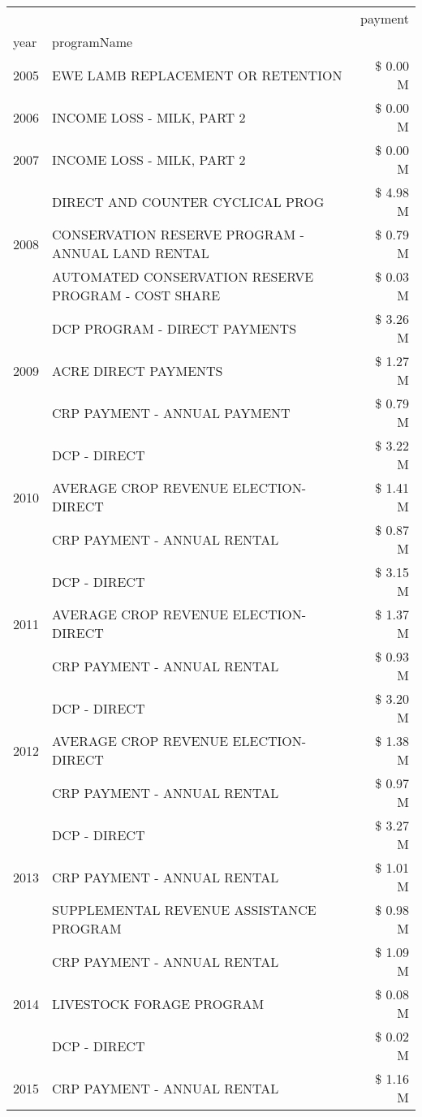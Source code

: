 \begin{tabular}{llr}
\toprule
 &  & payment \\
year & programName &  \\
\midrule
2005 & EWE LAMB REPLACEMENT OR RETENTION & \$ 0.00 M \\
\cline{1-3}
2006 & INCOME LOSS - MILK, PART 2 & \$ 0.00 M \\
\cline{1-3}
2007 & INCOME LOSS - MILK, PART 2 & \$ 0.00 M \\
\cline{1-3}
\multirow[t]{3}{*}{2008} & DIRECT AND COUNTER CYCLICAL PROG & \$ 4.98 M \\
 & CONSERVATION RESERVE PROGRAM - ANNUAL LAND RENTAL & \$ 0.79 M \\
 & AUTOMATED CONSERVATION RESERVE PROGRAM - COST SHARE & \$ 0.03 M \\
\cline{1-3}
\multirow[t]{3}{*}{2009} & DCP PROGRAM - DIRECT PAYMENTS & \$ 3.26 M \\
 & ACRE DIRECT PAYMENTS & \$ 1.27 M \\
 & CRP PAYMENT - ANNUAL PAYMENT & \$ 0.79 M \\
\cline{1-3}
\multirow[t]{3}{*}{2010} & DCP - DIRECT & \$ 3.22 M \\
 & AVERAGE CROP REVENUE ELECTION-DIRECT & \$ 1.41 M \\
 & CRP PAYMENT - ANNUAL RENTAL & \$ 0.87 M \\
\cline{1-3}
\multirow[t]{3}{*}{2011} & DCP - DIRECT & \$ 3.15 M \\
 & AVERAGE CROP REVENUE ELECTION-DIRECT & \$ 1.37 M \\
 & CRP PAYMENT - ANNUAL RENTAL & \$ 0.93 M \\
\cline{1-3}
\multirow[t]{3}{*}{2012} & DCP - DIRECT & \$ 3.20 M \\
 & AVERAGE CROP REVENUE ELECTION-DIRECT & \$ 1.38 M \\
 & CRP PAYMENT - ANNUAL RENTAL & \$ 0.97 M \\
\cline{1-3}
\multirow[t]{3}{*}{2013} & DCP - DIRECT & \$ 3.27 M \\
 & CRP PAYMENT - ANNUAL RENTAL & \$ 1.01 M \\
 & SUPPLEMENTAL REVENUE ASSISTANCE PROGRAM & \$ 0.98 M \\
\cline{1-3}
\multirow[t]{3}{*}{2014} & CRP PAYMENT - ANNUAL RENTAL & \$ 1.09 M \\
 & LIVESTOCK FORAGE PROGRAM & \$ 0.08 M \\
 & DCP - DIRECT & \$ 0.02 M \\
\cline{1-3}
\multirow[t]{3}{*}{2015} & CRP PAYMENT - ANNUAL RENTAL & \$ 1.16 M \\

\end{tabular}
